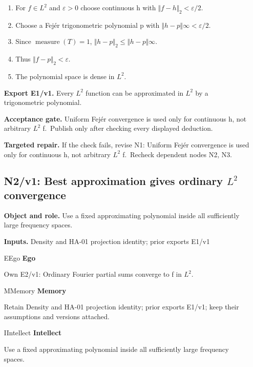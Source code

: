 \documentclass[preprint,12pt,aps,pra,showkeys,amsmath,amssymb,superscriptaddress,floatfix]{revtex4-2}
\theoremstyle{definition}
\theoremstyle{remark}
\newcommand{\mmfaculty}[3]{%
 \begin{mmfacultybox}{#1}{#2}
 {\sffamily\bfseries\color{MMBlue}#2}\par\smallskip #3
 \end{mmfacultybox}}
\newcommand{\field}[2]{\par\smallskip\noindent\textbf{#1.} #2\par}
\begin{document}
\begin{enumerate}[label=N1.\arabic*,leftmargin=3.4em]

\item For \(f\in L^{2}\) and \(\varepsilon >0\) choose continuous h with
\(\Vert f-h\Vert _{2}<\varepsilon /2\).

\item Choose a Fejér trigonometric polynomial p with
\(\Vert h-p\Vert \infty <\varepsilon /2\).

\item Since \(\operatorname{measure} (T)=1\),
\(\Vert h-p\Vert _{2}\le \Vert h-p\Vert \infty\).

\item Thus \(\Vert f-p\Vert _{2}<\varepsilon\).

\item The polynomial space is dense in \(L^{2}\).

\end{enumerate}

\field{Export E1/v1}{Every \(L^{2}\) function can be approximated in \(L^{2}\) by a
trigonometric polynomial.}

\field{Acceptance gate}{Uniform Fejér convergence is used only for continuous h, not arbitrary
\(L^{2}\) f.~Publish only after checking every displayed deduction.}

\field{Targeted repair}{If the check fails, revise N1: Uniform Fejér convergence is used only
for continuous h, not arbitrary \(L^{2}\) f.~Recheck dependent nodes N2,
N3.}

\clearpage

\subsection{N2/v1: Best approximation gives ordinary \(L^{2}\) convergence}

\field{Object and role}{Use a fixed approximating polynomial inside all sufficiently large
frequency spaces.}

\field{Inputs}{Density and HA-01 projection identity; prior exports E1/v1}

\mmfaculty{E}{Ego}{Own E2/v1: Ordinary Fourier partial sums converge to f in \(L^{2}\).}

\mmfaculty{M}{Memory}{Retain Density and HA-01 projection identity; prior exports E1/v1; keep
their assumptions and versions attached.}

\mmfaculty{I}{Intellect}{Use a fixed approximating polynomial inside all sufficiently large
frequency spaces.}
\end{document}
